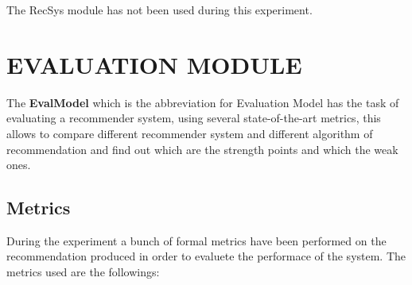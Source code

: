 \documentclass[11pt]{article}
\begin{document}
The RecSys module has not been used during this experiment.
\hfill\break
\hfill\break

\section{EVALUATION MODULE}\label{sec:eva-module}
The \textbf{EvalModel} which is the abbreviation for Evaluation Model has the task of evaluating a recommender system,
using several state-of-the-art metrics, this allows to compare different recommender system and different algorithm of
recommendation and find out which are the strength points and which the weak ones.

\subsection{Metrics}\label{subsec:metrics}
During the experiment a bunch of formal metrics have been performed on the recommendation produced in order to evaluete
the performace of the system.
The metrics used are the followings:
\hfill\break
\hfill\break

\end{document}
